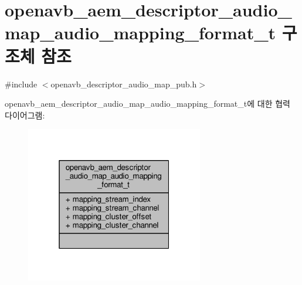 \hypertarget{structopenavb__aem__descriptor__audio__map__audio__mapping__format__t}{}\section{openavb\+\_\+aem\+\_\+descriptor\+\_\+audio\+\_\+map\+\_\+audio\+\_\+mapping\+\_\+format\+\_\+t 구조체 참조}
\label{structopenavb__aem__descriptor__audio__map__audio__mapping__format__t}


{\ttfamily \#include $<$openavb\+\_\+descriptor\+\_\+audio\+\_\+map\+\_\+pub.\+h$>$}



openavb\+\_\+aem\+\_\+descriptor\+\_\+audio\+\_\+map\+\_\+audio\+\_\+mapping\+\_\+format\+\_\+t에 대한 협력 다이어그램\+:
\nopagebreak
\begin{figure}[H]
\begin{center}
\leavevmode
\includegraphics[width=220pt]{structopenavb__aem__descriptor__audio__map__audio__mapping__format__t__coll__graph}
\end{center}
\end{figure}
